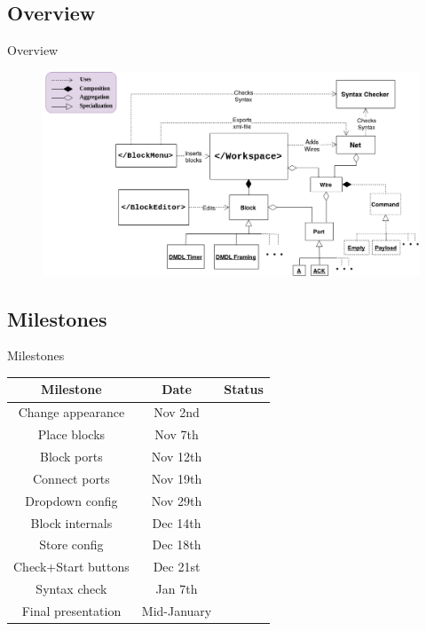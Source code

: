 \documentclass{beamer}
\begin{document}
\subsection*{Overview}
\begin{frame}{Overview}
\centering
	\begin{figure}
 		\includegraphics[width=\linewidth]{dmdl-editor.png}
		\label{fig:uml}
	\end{figure}
\end{frame}

    \subsection{Milestones}
    \begin{frame}{Milestones}
    \centering
	    \begin{tabular}{|c|c|c|} \hline
		    \textbf{Milestone} & \textbf{Date} & \textbf{Status} \\ \hline
		    Change appearance & Nov 2nd & \color{green}{Done} \\ \hline
		    Place blocks & Nov 7th & \color{green}{Done} \\ \hline
		    Block ports & Nov 12th & \color{green}{Done} \\ \hline
		    Connect ports & Nov 19th & \color{green}{Done} \\ \hline
		    Dropdown config & Nov 29th & \color{green}{Done} \\ \hline
		    Block internals & Dec 14th & \color{red}{Partly Done} \\ \hline
		    Store config & Dec 18th & \color{red}{Done} \\ \hline
		    Check+Start buttons & Dec 21st & \color{red}{Done} \\ \hline
		    Syntax check & Jan 7th & \color{red}{Done} \\ \hline
		    Final presentation & Mid-January & \color{red}{Not Done} \\ \hline
	    \end{tabular}
    \end{frame}
\end{document}
